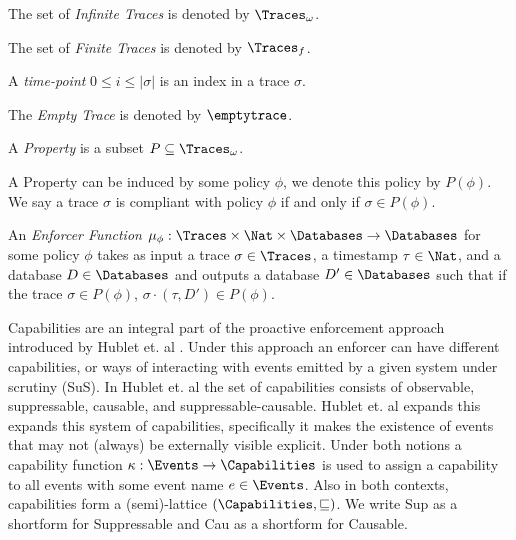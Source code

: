 \begin{definition}\label{def:infinite-trace}
    The set of \emph{Infinite Traces} is denoted by $\Traces_\omega$.
\end{definition}

\begin{definition}\label{def:finite-trace}
    The set of \emph{Finite Traces} is denoted by $\Traces_f$.
\end{definition}

\begin{definition}\label{def:time-point}
    A \emph{time-point} $0 \leq i \leq |\sigma|$ is an index in a trace $\sigma$.
\end{definition}

\begin{definition}\label{def:empty-trace}
    The \emph{Empty Trace} is denoted by $\emptytrace$.
\end{definition}

\begin{definition}\label{def:property}
    A \emph{Property} is a subset $P\subseteq \Traces_\omega$.
\end{definition}

A Property can be induced by some policy $\phi$, we denote this policy by
$P(\phi)$.
We say a trace $\sigma$ is compliant with policy $\phi$ if and only if
$\sigma \in P(\phi)$.

\begin{definition}
   An \emph{Enforcer Function}
   $\mu_\phi : \Traces \times \Nat \times \Databases \to \Databases$
   for some policy $\phi$ takes as input a trace $\sigma \in \Traces$,
   a timestamp $\tau \in \Nat$, and a database $D \in \Databases$ and outputs a database $D' \in \Databases$
   such that if the trace $\sigma \in P(\phi)$,
   $\sigma \cdot \left(\tau, D'\right) \in P(\phi)$.
\end{definition}

Capabilities are an integral part of the proactive enforcement
approach introduced by Hublet et. al \cite{whyenf}.
Under this approach an enforcer can have different capabilities, or ways of interacting
with events emitted by a given system under scrutiny (SuS).
In Hublet et. al the set of capabilities consists of observable, suppressable, causable,
and suppressable-causable.
Hublet et. al \cite{lex} expands this expands this system of capabilities, specifically it
makes the existence of events that may not (always) be externally visible explicit.
Under both notions a capability function $\kappa : \Events \to \Capabilities$ is used
to assign a capability to all events with some event name $e \in \Events$.
Also in both contexts, capabilities form a (semi)-lattice $(\Capabilities, \sqsubseteq)$.
We write Sup as a shortform for Suppressable and Cau as a shortform for Causable.

